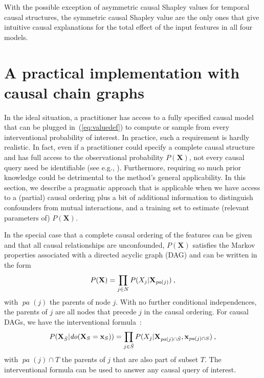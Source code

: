 \documentclass{article}
\newcommand{\vX}{\mathbf{X}}
\newcommand{\vx}{\mathbf{x}}
\newcommand{\dodo}{\mathit{do}}
\newcommand{\lvdo}[1]{\dodo(\vX_{#1} = \vx_{#1})}
\newcommand{\pa}{\mathop{\textit{pa}}}
\newcommand{\spa}{\mathop{\textit{\scriptsize pa}}}
\newcommand{\allfeatures}{{N}}
\begin{document}
With the possible exception of asymmetric causal Shapley values for temporal causal structures, the symmetric causal Shapley value are the only ones that give intuitive causal explanations for the total effect of the input features in all four models.


\section{A practical implementation with causal chain graphs}

In the ideal situation, a practitioner has access to a fully specified causal model that can be plugged in~(\ref{eq:valuedef}) to compute or sample from every interventional probability of interest. In practice, such a requirement is hardly realistic. In fact, even if a practitioner could specify a complete causal structure and has full access to the observational probability $P(\vX)$, not every causal query need be identifiable (see e.g., \cite{pearl2012calculus}). Furthermore, requiring so much prior knowledge could be detrimental to the method's general applicability. In this section, we describe a pragmatic approach that is applicable when we have access to a (partial) causal ordering plus a bit of additional information to distinguish confounders from mutual interactions, and a training set to estimate (relevant parameters of) $P(\vX)$.  

In the special case that a complete causal ordering of the features can be given and that all causal relationships are unconfounded, $P(\vX)$ satisfies the Markov properties associated with a directed acyclic graph (DAG) and can be written in the form
\[
P(\vX) = \prod_{j \in \allfeatures} P(X_j|\vX_{\spa(j)}) \: ,
\]
with $\pa(j)$ the parents of node $j$. With no further conditional independences, the parents of $j$ are all nodes that precede $j$ in the causal ordering. For causal DAGs, we have the interventional formula~\cite{lauritzen2002chain}:
\begin{equation}
P(\vX_{\bar{S}}|\lvdo{S}) = \prod_{j \in \bar{S}} P(X_j|\vX_{\spa(j)  \cap \bar{S}},\vx_{\spa(j) \cap S}) \: ,
\label{eq:interventional}
\end{equation}
with $\pa(j) \cap T$ the parents of $j$ that are also part of subset $T$. The interventional formula can be used to answer any causal query of interest.
\end{document}
